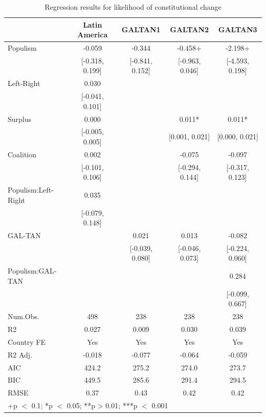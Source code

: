 \documentclass[
  abstract]{article}
\begin{document}
\blandscape

\hypertarget{tbl-resultschange_EU}{}
\begin{table}
\caption{\label{tbl-resultschange_EU}Regression results for likelihood of constitutional change }\tabularnewline

\centering\centering\centering
\begin{tabular}[t]{lcccc}
\toprule
  & Latin America & GALTAN1 & GALTAN2 & GALTAN3\\
\midrule
Populism & -0.059 & -0.344 & -0.458+ & -2.198+\\
 & {}[-0.318, 0.199] & {}[-0.841, 0.152] & {}[-0.963, 0.046] & {}[-4.593, 0.198]\\
Left-Right & 0.030 &  &  & \\
 & {}[-0.041, 0.101] &  &  & \\
Surplus & 0.000 &  & 0.011* & 0.011*\\
 & {}[-0.005, 0.005] &  & {}[0.001, 0.021] & {}[0.000, 0.021]\\
Coalition & 0.002 &  & -0.075 & -0.097\\
 & {}[-0.101, 0.106] &  & {}[-0.294, 0.144] & {}[-0.317, 0.123]\\
Populism:Left-Right & 0.035 &  &  & \\
 & {}[-0.079, 0.148] &  &  & \\
GAL-TAN &  & 0.021 & 0.013 & -0.082\\
 &  & {}[-0.039, 0.080] & {}[-0.046, 0.073] & {}[-0.224, 0.060]\\
Populism:GAL-TAN &  &  &  & 0.284\\
 &  &  &  & {}[-0.099, 0.667]\\
\midrule
Num.Obs. & 498 & 238 & 238 & 238\\
R2 & 0.027 & 0.009 & 0.030 & 0.039\\
Country FE & Yes & Yes & Yes & Yes\\
R2 Adj. & -0.018 & -0.077 & -0.064 & -0.059\\
AIC & 424.2 & 275.2 & 274.0 & 273.7\\
BIC & 449.5 & 285.6 & 291.4 & 294.5\\
RMSE & 0.37 & 0.43 & 0.42 & 0.42\\
\bottomrule
\multicolumn{5}{l}{\rule{0pt}{1em}+p $<$ 0.1; *p $<$ 0.05; **p > 0.01; ***p $<$ 0.001}\\
\end{tabular}
\end{table}
\end{document}
